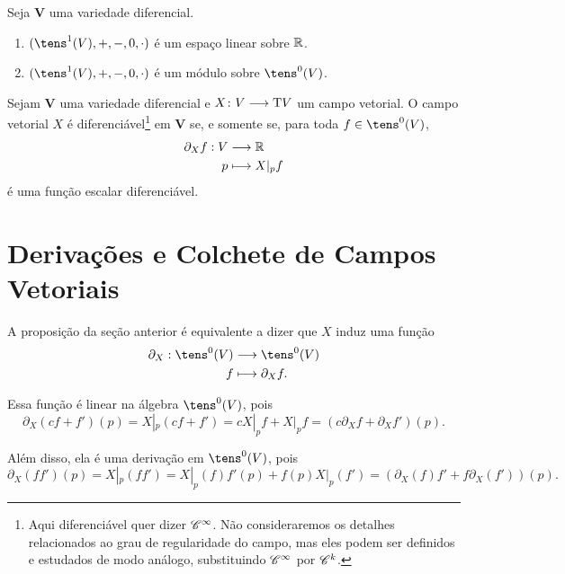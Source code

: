 \begin{prop}
Seja $\bm V$ uma variedade diferencial.
	\begin{enumerate}
	\item $(\tens^1(V),+,-,0,\cdot)$ é um espaço linear sobre $\mathbb{R}$.
	\item $(\tens^1(V),+,-,0,\cdot)$ é um módulo sobre $\tens^0(V)$.
	\end{enumerate}
\end{prop}

\begin{prop}
Sejam $\bm V$ uma variedade diferencial e $X\colon V \longrightarrow \mathrm{T} V$ um campo vetorial. O campo vetorial $X$ é diferenciável\footnote{Aqui diferenciável quer dizer $\mathscr{C}^\infty$. Não consideraremos os detalhes relacionados ao grau de regularidade do campo, mas eles podem ser definidos e estudados de modo análogo, substituindo $\mathscr{C}^\infty$ por $\mathscr{C}^k$.} em $\bm V$ se, e somente se, para toda $f \in \tens^0(V)$,
	\begin{align*}
	{\partial_X f}: {V} &\longrightarrow {\mathbb{R}} \\{p} &\longmapsto {X|_p f}
	\end{align*}
é uma função escalar diferenciável.
\end{prop}

\section{Derivações e Colchete de Campos Vetoriais}

A proposição da seção anterior é equivalente a dizer que $X$ induz uma função
	\begin{align*}
	\func{\partial_X}{\tens^0(V)}{\tens^0(V)}{f}{\partial_X f.}
	\end{align*}

Essa função é linear na álgebra $\tens^0(V)$, pois
	\begin{equation*}
	\partial_X(cf+f')(p) = X|_p(cf+f') = cX|_p f + X|_p f = (c\partial_X f + \partial_X f')(p).
	\end{equation*}

Além disso, ela é uma derivação em $\tens^0(V)$, pois
	\begin{equation*}
	\partial_X(ff')(p) = X|_p(ff') = X|_p(f)f'(p) + f(p) X|_p(f') = (\partial_X(f)f'+f\partial_X(f'))(p).
	\end{equation*}


